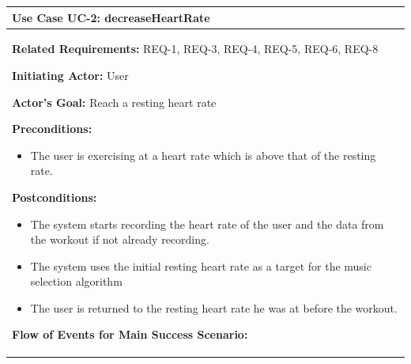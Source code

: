 \documentclass[letterpaper,english, 12pt]{scrreprt}
\begin{document}
\begin{center}
        \begin{tabular}{|C{15cm}|}
                \hline
                        \textbf{Use Case UC-2: decreaseHeartRate}\\
                \hline
                        \begin{flushleft}
                                \textbf{Related Requirements: } REQ-1, REQ-3, REQ-4, REQ-5, REQ-6, REQ-8
                        \end{flushleft}
                        \begin{flushleft}
                                \textbf{Initiating Actor: } User
                        \end{flushleft}
                        \begin{flushleft}
                                \textbf{Actor's Goal: } Reach a resting heart rate
                        \end{flushleft}
                        \begin{flushleft}
                                \textbf{Preconditions: }
                        \end{flushleft}
                                \begin{itemize}
                                        \item The user is exercising at a heart rate which is above that of the resting rate.
                                \end{itemize}
                        \begin{flushleft}
                                \textbf{Postconditions: }
                        \end{flushleft}
                                \begin{itemize}
                                        \item The system starts recording the heart rate of the user and the data from the workout if not already recording.
                                        \item The system uses the initial resting heart rate as a target for the music selection algorithm
                                        \item The user is returned to the resting heart rate he was at before the workout.
                                \end{itemize}
                        \begin{flushleft}
                                \textbf{Flow of Events for Main Success Scenario: }

\end{flushleft}
\end{tabular}
\end{center}
\end{document}
